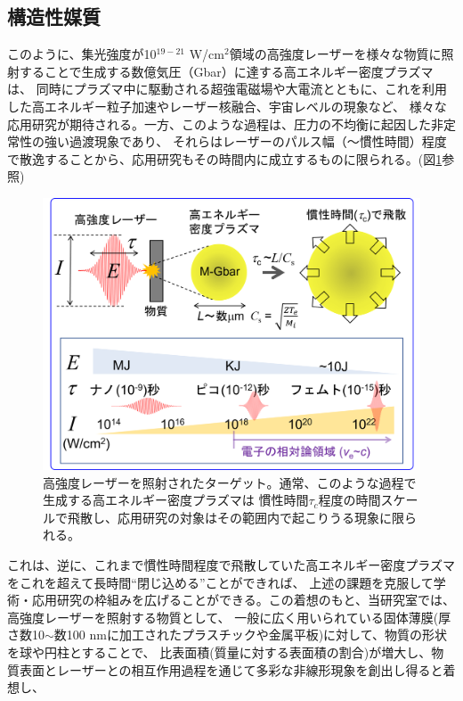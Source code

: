 \documentclass[a4paper,11pt,titlepage]{jsarticle}
\begin{document}
  \subsection{構造性媒質}
  このように、集光強度が10$^{19-21}$ W/cm$^{2}$領域の高強度レーザーを様々な物質に照射することで生成する数億気圧（Gbar）に達する高エネルギー密度プラズマは、
  同時にプラズマ中に駆動される超強電磁場や大電流とともに、これを利用した高エネルギー粒子加速やレーザー核融合、宇宙レベルの現象など、
  様々な応用研究が期待される。一方、このような過程は、圧力の不均衡に起因した非定常性の強い過渡現象であり、
  それらはレーザーのパルス幅（～慣性時間）程度で散逸することから、応用研究もその時間内に成立するものに限られる。(図\ref{fig:1-3_1}参照)
  \begin{figure}[H]
    \begin{center}
      \includegraphics[keepaspectratio,width=\linewidth]{./image/1-3/1-3_1.png}
      \caption{
        \label{fig:1-3_1}
          高強度レーザーを照射されたターゲット。通常、このような過程で生成する高エネルギー密度プラズマは
          慣性時間$\tau_c$程度の時間スケールで飛散し、応用研究の対象はその範囲内で起こりうる現象に限られる。
      }
    \end{center}
  \end{figure}
  これは、逆に、これまで慣性時間程度で飛散していた高エネルギー密度プラズマをこれを超えて長時間“閉じ込める”ことができれば、
  上述の課題を克服して学術・応用研究の枠組みを広げることができる。この着想のもと、当研究室では、高強度レーザーを照射する物質として、
  一般に広く用いられている固体薄膜(厚さ数10$\sim$数100 nmに加工されたプラスチックや金属平板)に対して、物質の形状を球や円柱とすることで、
  比表面積(質量に対する表面積の割合)が増大し、物質表面とレーザーとの相互作用過程を通じて多彩な非線形現象を創出し得ると着想し、
\end{document}
